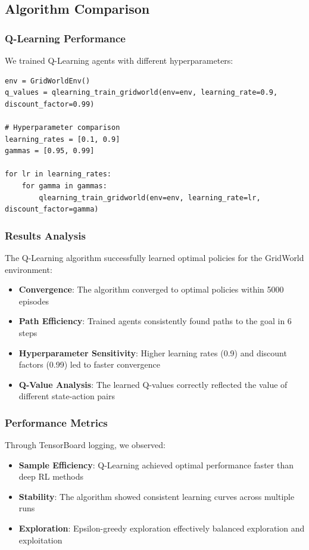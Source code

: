 \documentclass[12pt]{article}
\begin{document}
{{{\subsection{Algorithm Comparison}

\subsubsection{Q-Learning Performance}

We trained Q-Learning agents with different hyperparameters:

\begin{verbatim}
env = GridWorldEnv()
q_values = qlearning_train_gridworld(env=env, learning_rate=0.9, discount_factor=0.99)

# Hyperparameter comparison
learning_rates = [0.1, 0.9]  
gammas = [0.95, 0.99]

for lr in learning_rates:
    for gamma in gammas:
        qlearning_train_gridworld(env=env, learning_rate=lr, discount_factor=gamma)
\end{verbatim}

\subsubsection{Results Analysis}

The Q-Learning algorithm successfully learned optimal policies for the GridWorld environment:

\begin{itemize}
    \item \textbf{Convergence}: The algorithm converged to optimal policies within 5000 episodes
    \item \textbf{Path Efficiency}: Trained agents consistently found paths to the goal in 6 steps
    \item \textbf{Hyperparameter Sensitivity}: Higher learning rates (0.9) and discount factors (0.99) led to faster convergence
    \item \textbf{Q-Value Analysis}: The learned Q-values correctly reflected the value of different state-action pairs
\end{itemize}

\subsubsection{Performance Metrics}

Through TensorBoard logging, we observed:

\begin{itemize}
    \item \textbf{Sample Efficiency}: Q-Learning achieved optimal performance faster than deep RL methods
    \item \textbf{Stability}: The algorithm showed consistent learning curves across multiple runs
    \item \textbf{Exploration}: Epsilon-greedy exploration effectively balanced exploration and exploitation
\end{itemize}

}}}
\end{document}

